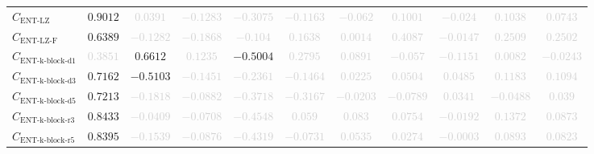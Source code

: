 \documentclass{standalone}
\newcommand{\entlempelzivname}{\text{ENT-LZ}}
\newcommand{\entlempelziv}{C_{\entlempelzivname}}
\newcommand{\entlempelzivflatname}{\text{ENT-LZ-F}}
\newcommand{\entlempelzivflat}{C_{\entlempelzivflatname}}
\newcommand{\entkblockdonename}{\text{ENT-k-block-d1}}
\newcommand{\entkblockdone}{C_{\entkblockdonename}}
\newcommand{\entkblockdthreename}{\text{ENT-k-block-d3}}
\newcommand{\entkblockdthree}{C_{\entkblockdthreename}}
\newcommand{\entkblockdfivename}{\text{ENT-k-block-d5}}
\newcommand{\entkblockdfive}{C_{\entkblockdfivename}}
\newcommand{\entkblockrthreename}{\text{ENT-k-block-r3}}
\newcommand{\entkblockrthree}{C_{\entkblockrthreename}}
\newcommand{\entkblockrfivename}{\text{ENT-k-block-r5}}
\newcommand{\entkblockrfive}{C_{\entkblockrfivename}}
\begin{document}
\begin{tabular}{lcccccccccc}
$\entlempelziv$ & $0.9012$ & \textcolor{lightgray}{$0.0391$} & \textcolor{lightgray}{$-0.1283$} & \textcolor{lightgray}{$-0.3075$} & \textcolor{lightgray}{$-0.1163$} & \textcolor{lightgray}{$-0.062$} & \textcolor{lightgray}{$0.1001$} & \textcolor{lightgray}{$-0.024$} & \textcolor{lightgray}{$0.1038$} & \textcolor{lightgray}{$0.0743$} \\ 
$\entlempelzivflat$ & $0.6389$ & \textcolor{lightgray}{$-0.1282$} & \textcolor{lightgray}{$-0.1868$} & \textcolor{lightgray}{$-0.104$} & \textcolor{lightgray}{$0.1638$} & \textcolor{lightgray}{$0.0014$} & \textcolor{lightgray}{$0.4087$} & \textcolor{lightgray}{$-0.0147$} & \textcolor{lightgray}{$0.2509$} & \textcolor{lightgray}{$0.2502$} \\ 
$\entkblockdone$ & \textcolor{lightgray}{$0.3851$} & $0.6612$ & \textcolor{lightgray}{$0.1235$} & $-0.5004$ & \textcolor{lightgray}{$0.2795$} & \textcolor{lightgray}{$0.0891$} & \textcolor{lightgray}{$-0.057$} & \textcolor{lightgray}{$-0.1151$} & \textcolor{lightgray}{$0.0082$} & \textcolor{lightgray}{$-0.0243$} \\ 
$\entkblockdthree$ & $0.7162$ & $-0.5103$ & \textcolor{lightgray}{$-0.1451$} & \textcolor{lightgray}{$-0.2361$} & \textcolor{lightgray}{$-0.1464$} & \textcolor{lightgray}{$0.0225$} & \textcolor{lightgray}{$0.0504$} & \textcolor{lightgray}{$0.0485$} & \textcolor{lightgray}{$0.1183$} & \textcolor{lightgray}{$0.1094$} \\ 
$\entkblockdfive$ & $0.7213$ & \textcolor{lightgray}{$-0.1818$} & \textcolor{lightgray}{$-0.0882$} & \textcolor{lightgray}{$-0.3718$} & \textcolor{lightgray}{$-0.3167$} & \textcolor{lightgray}{$-0.0203$} & \textcolor{lightgray}{$-0.0789$} & \textcolor{lightgray}{$0.0341$} & \textcolor{lightgray}{$-0.0488$} & \textcolor{lightgray}{$0.039$} \\ 
$\entkblockrthree$ & $0.8433$ & \textcolor{lightgray}{$-0.0409$} & \textcolor{lightgray}{$-0.0708$} & \textcolor{lightgray}{$-0.4548$} & \textcolor{lightgray}{$0.059$} & \textcolor{lightgray}{$0.083$} & \textcolor{lightgray}{$0.0754$} & \textcolor{lightgray}{$-0.0192$} & \textcolor{lightgray}{$0.1372$} & \textcolor{lightgray}{$0.0873$} \\ 
$\entkblockrfive$ & $0.8395$ & \textcolor{lightgray}{$-0.1539$} & \textcolor{lightgray}{$-0.0876$} & \textcolor{lightgray}{$-0.4319$} & \textcolor{lightgray}{$-0.0731$} & \textcolor{lightgray}{$0.0535$} & \textcolor{lightgray}{$0.0274$} & \textcolor{lightgray}{$-0.0003$} & \textcolor{lightgray}{$0.0893$} & \textcolor{lightgray}{$0.0823$} \\ 

\end{tabular}
\end{document}
